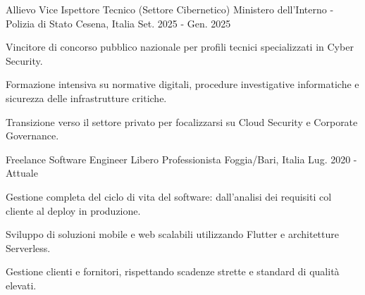 
\vspace{0.3cm}

\begin{cventries}

  \cventry
  {Allievo Vice Ispettore Tecnico (Settore Cibernetico)}
  {Ministero dell'Interno - Polizia di Stato}
  {Cesena, Italia}
  {Set. 2025 - Gen. 2025}
  {
    \begin{cvitems}
      \item {Vincitore di concorso pubblico nazionale per profili tecnici specializzati in Cyber Security.}
      \item {Formazione intensiva su normative digitali, procedure investigative informatiche e sicurezza delle infrastrutture critiche.}
      \item {Transizione verso il settore privato per focalizzarsi su Cloud Security e Corporate Governance.}
    \end{cvitems}
  }

  \vspace{0.8cm}

  \cventry
  {Freelance Software Engineer}
  {Libero Professionista}
  {Foggia/Bari, Italia}
  {Lug. 2020 - Attuale}
  {
    \begin{cvitems}
      \item {Gestione completa del ciclo di vita del software: dall'analisi dei requisiti col cliente al deploy in produzione.}
      \item {Sviluppo di soluzioni mobile e web scalabili utilizzando Flutter e architetture Serverless.}
      \item {Gestione clienti e fornitori, rispettando scadenze strette e standard di qualità elevati.}
    \end{cvitems}
  }

\end{cventries}